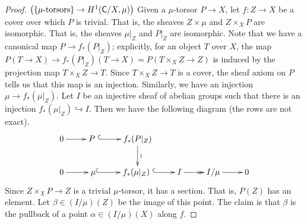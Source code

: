 \begin{proof}
 $\bigl(\{\mu\text{-torsors}\}\to H^1(\text{\sf C}/X,\mu)\bigr)$ Given a $\mu$-torsor $P\to X$, let $f:Z\to X$ be a cover over which $P$ is trivial. That is, the sheaves $Z\times\mu$ and $Z\times_X P$ are isomorphic. That is, the sheaves $\mu|_Z$ and $P|_Z$ are isomorphic. Note that we have a canonical map $P\to f_*(P|_Z)$; explicitly, for an object $T$ over $X$, the map $P(T\to X)\to f_*(P|_Z)(T\to X)=P(T\times_X Z\to Z)$ is induced by the projection map $T\times_X Z\to T$. Since $T\times_X Z\to T$ is a cover, the sheaf axiom on $P$ tells us that this map is an injection. Similarly, we have an injection $\mu\to f_*(\mu|_Z)$. Let $I$ be an injective sheaf of abelian groups such that there is an injection $f_*(\mu|_Z)\hookrightarrow I$. Then we have the following diagram (the rows are not exact).
 \[\xymatrix{
  0\ar[r]& P\ \ar@{^(->}[r] & f_*(P|_Z) \ar@{->}[d]^\wr\\
  0\ar[r] & \mu\ar@{^(->}[r] & f_*(\mu|_Z)\ \ar@{^(->}[r] & I\ar@{->>}[r] & I/\mu \ar[r] & 0
 }\]
 Since $Z\times_X P\to Z$ is a trivial $\mu$-torsor, it has a section. That is, $P(Z)$ has an element. Let $\beta\in (I/\mu)(Z)$ be the image of this point. The claim is that $\beta$ is the pullback of a point $\alpha\in (I/\mu)(X)$ along $f$. 

\end{proof}

